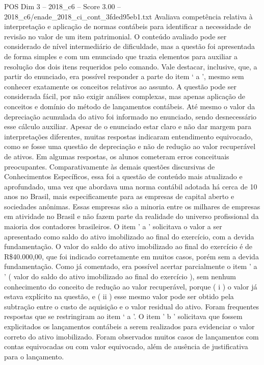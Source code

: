 \begin{textsample}{POS Dim 3 – 2018\_c6 – Score 3.00 – 2018\_c6/enade\_2018\_ci\_cont\_3fded95eb1.txt}
Avaliava competência relativa à interpretação e aplicação de normas contábeis para identificar a necessidade de revisão no valor de um item patrimonial.
O conteúdo avaliado pode ser considerado de nível intermediário de dificuldade, mas a questão foi apresentada de forma simples e com um enunciado que trazia elementos para auxiliar a resolução dos dois itens requeridos pelo comando.
Vale destacar, inclusive, que, a partir do enunciado, era possível responder a parte do item ‘ a ’, mesmo sem conhecer exatamente os conceitos relativos ao assunto.
A questão pode ser considerada fácil, por não exigir análises complexas, mas apenas aplicação de conceitos e domínio do método de lançamentos contábeis.
Até mesmo o valor da depreciação acumulada do ativo foi informado no enunciado, sendo desnecessário esse cálculo auxiliar.
Apesar de o enunciado estar claro e não dar margem para interpretações diferentes, muitas respostas indicaram entendimento equivocado, como se fosse uma questão de depreciação e não de redução ao valor recuperável de ativos.
Em algumas respostas, os alunos cometeram erros conceituais preocupantes.
Comparativamente às demais questões discursivas de Conhecimentos Específicos, essa foi a questão de conteúdo mais atualizado e aprofundado, uma vez que abordava uma norma contábil adotada há cerca de 10 anos no Brasil, mais especificamente para as empresas de capital aberto e sociedades anônimas.
Essas empresas são a minoria entre os milhares de empresas em atividade no Brasil e não fazem parte da realidade do universo profissional da maioria dos contadores brasileiros.
O item ' a ' solicitava o valor a ser apresentado como saldo do ativo imobilizado ao final do exercício, com a devida fundamentação.
O valor do saldo do ativo imobilizado ao final do exercício é de R\$40.000,00, que foi indicado corretamente em muitos casos, porém sem a devida fundamentação.
Como já comentado, era possível acertar parcialmente o item ' a ' ( valor do saldo do ativo imobilizado ao final do exercício ), sem nenhum conhecimento do conceito de redução ao valor recuperável, porque ( i ) o valor já estava explícito na questão, e ( ii ) esse mesmo valor pode ser obtido pela subtração entre o custo de aquisição e o valor residual do ativo.
Foram frequentes respostas que se restringiram ao item ‘ a ’.
O item ' b ' solicitava que fossem explicitados os lançamentos contábeis a serem realizados para evidenciar o valor correto do ativo imobilizado.
Foram observados muitos casos de lançamentos com contas equivocadas ou com valor equivocado, além de ausência de justificativa para o lançamento.

\end{textsample}
